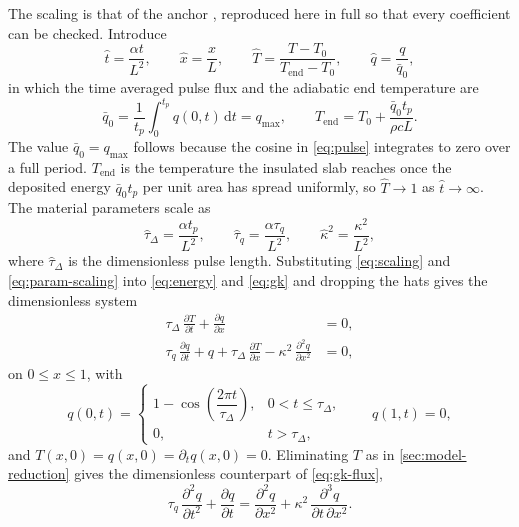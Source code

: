 \documentclass[preprint,12pt,a4paper]{elsarticle}
\theoremstyle{plain}
\theoremstyle{definition}
\theoremstyle{remark}
\newcommand{\tq}{\tau_{q}}
\newcommand{\kk}{\kappa^{2}}
\begin{document}
The scaling is that of the anchor \cite{Kovacs2018}, reproduced here in full so
that every coefficient can be checked. Introduce
%
\begin{equation}
  \hat{t} = \frac{\alpha t}{L^{2}}, \qquad
  \hat{x} = \frac{x}{L}, \qquad
  \hat{T} = \frac{T - T_{0}}{T_{\mathrm{end}} - T_{0}}, \qquad
  \hat{q} = \frac{q}{\bar{q}_{0}} ,
  \label{eq:scaling}
\end{equation}
%
in which the time averaged pulse flux and the adiabatic end temperature are
%
\begin{equation}
  \bar{q}_{0} = \frac{1}{t_{p}}\int_{0}^{t_{p}} q(0,t)\,\mathrm{d}t
             = q_{\max},
  \qquad
  T_{\mathrm{end}} = T_{0} + \frac{\bar{q}_{0} t_{p}}{\rho c L} .
  \label{eq:Tend}
\end{equation}
%
The value $\bar{q}_{0} = q_{\max}$ follows because the cosine in
\eqref{eq:pulse} integrates to zero over a full period. $T_{\mathrm{end}}$ is
the temperature the insulated slab reaches once the deposited energy
$\bar{q}_{0} t_{p}$ per unit area has spread uniformly, so $\hat{T} \to 1$ as
$\hat{t}\to\infty$. The material parameters scale as
%
\begin{equation}
  \hat{\tau}_{\Delta} = \frac{\alpha t_{p}}{L^{2}}, \qquad
  \hat{\tau}_{q} = \frac{\alpha \tq}{L^{2}}, \qquad
  \hat{\kappa}^{2} = \frac{\kk}{L^{2}} ,
  \label{eq:param-scaling}
\end{equation}
%
where $\hat{\tau}_{\Delta}$ is the dimensionless pulse length. Substituting
\eqref{eq:scaling} and \eqref{eq:param-scaling} into \eqref{eq:energy} and
\eqref{eq:gk} and dropping the hats gives the dimensionless system
%
\begin{align}
  \tau_{\Delta}\, \frac{\partial T}{\partial t}
    + \frac{\partial q}{\partial x} &= 0 ,
  \label{eq:nd-energy} \\[1ex]
  \tq \, \frac{\partial q}{\partial t} + q
    + \tau_{\Delta} \, \frac{\partial T}{\partial x}
    - \kk \, \frac{\partial^{2} q}{\partial x^{2}} &= 0 ,
  \label{eq:nd-gk}
\end{align}
%
on $0 \leq x \leq 1$, with
%
\begin{equation}
  q(0,t) =
  \begin{cases}
    1 - \cos\!\left(\dfrac{2\pi t}{\tau_{\Delta}}\right),
      & 0 < t \leq \tau_{\Delta}, \\[2ex]
    0, & t > \tau_{\Delta},
  \end{cases}
  \qquad q(1,t) = 0 ,
  \label{eq:nd-bc}
\end{equation}
%
and $T(x,0) = q(x,0) = \partial_{t} q(x,0) = 0$. Eliminating $T$ as in
\cref{sec:model-reduction} gives the dimensionless counterpart of
\eqref{eq:gk-flux},
%
\begin{equation}
  \tq \, \frac{\partial^{2} q}{\partial t^{2}}
  + \frac{\partial q}{\partial t}
  = \frac{\partial^{2} q}{\partial x^{2}}
  + \kk \, \frac{\partial^{3} q}{\partial t \, \partial x^{2}} .
  \label{eq:nd-flux}
\end{equation}
\end{document}
